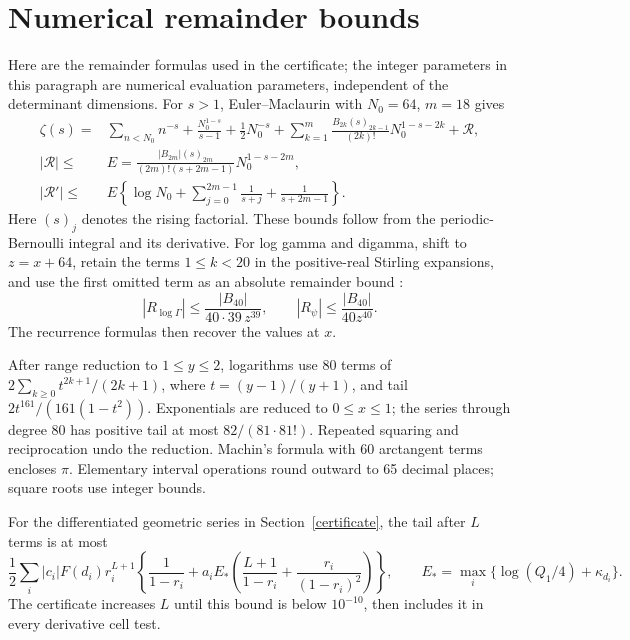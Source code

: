 \documentclass[11pt]{article}
\begin{document}
\section{Numerical remainder bounds}\label{remainders}
Here are the remainder formulas used in the certificate; the integer
parameters in this paragraph are numerical evaluation parameters,
independent of the determinant dimensions.
For \(s>1\), Euler--Maclaurin with \(N_0=64\), \(m=18\) gives
\begin{align*}
 \zeta(s)={}&\sum_{n<N_0}n^{-s}+\frac{N_0^{1-s}}{s-1}
      +\frac12N_0^{-s}
      +\sum_{k=1}^{m}\frac{B_{2k}(s)_{2k-1}}{(2k)!}
                      N_0^{1-s-2k}+\mathcal R,\\
 |\mathcal R|\le{}&E=
 \frac{|B_{2m}|(s)_{2m}}{(2m)!(s+2m-1)}N_0^{1-s-2m},\\
 |\mathcal R'|\le{}&E\left\{\log N_0+
       \sum_{j=0}^{2m-1}\frac1{s+j}+\frac1{s+2m-1}\right\}.
\end{align*}
Here \((s)_j\) denotes the rising factorial. These bounds follow
from the periodic-Bernoulli integral and its derivative.
For log gamma and digamma, shift to \(z=x+64\), retain the terms
\(1\le k<20\) in the positive-real Stirling expansions, and use
the first omitted term as an absolute remainder bound
\cite{dlmf}:
\[
 |R_{\log\Gamma}|\le\frac{|B_{40}|}{40\cdot39\,z^{39}},
 \qquad |R_\psi|\le\frac{|B_{40}|}{40z^{40}}.
\]
The recurrence formulas then recover the values at \(x\).

After range reduction to \(1\le y\le2\), logarithms use 80 terms
of \(2\sum_{k\ge0}t^{2k+1}/(2k+1)\), where
\(t=(y-1)/(y+1)\), and tail
\(2t^{161}/(161(1-t^2))\). Exponentials are reduced to
\(0\le x\le1\); the series through degree 80 has positive tail
at most \(82/(81\cdot81!)\). Repeated squaring and reciprocation
undo the reduction. Machin's formula with 60 arctangent terms
encloses \(\pi\). Elementary interval operations round outward
to 65 decimal places; square roots use integer bounds.

For the differentiated geometric series in Section~\ref{certificate},
the tail after
\(L\) terms is at most
\[
 \frac12\sum_i |c_i|F(d_i)r_i^{L+1}
 \left\{\frac1{1-r_i}+a_i E_*
       \left(\frac{L+1}{1-r_i}+\frac{r_i}{(1-r_i)^2}\right)\right\},
 \qquad E_*=\max_i\{\log(Q_1/4)+\kappa_{d_i}\}.
\]
The certificate increases \(L\) until this bound is below
\(10^{-10}\), then includes it in every derivative cell test.
\end{document}
